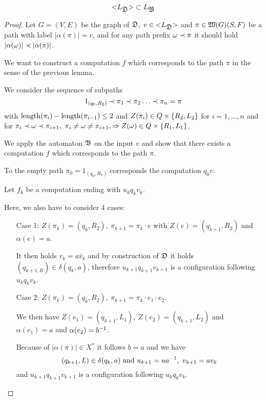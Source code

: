 \bigskip
\begin{lemma}
\[ \mbox{${<}{L_{\mbox{$\mathfrak{D}$}}}{>}$} \subset L_{\mbox{$\mathfrak{B}$}} \]
\end{lemma}

\begin{proof}
Let $G = (V, E)$ be the graph of $\mbox{$\mathfrak{D}$}$, $v \in \mbox{${<}{L_{\mbox{$\mathfrak{D}$}}}{>}$}$ and
$\pi \in \mbox{$\mathfrak{W}({G})$}(S, F)$ be a path with label $|\alpha(\pi)| = v$, and for
any path prefix $\omega \prec \pi$ it should hold $|\alpha(\omega)| \prec
|\alpha(\pi)|$.

We want to construct a computation $f$ which corresponds to the path $\pi$ in
the sense of the previous lemma.

We consider the sequence of subpaths
\[ 1_{(q_0, R_2)} \prec \pi_1 \prec \pi_2 \ldots \prec \pi_n = \pi \]
with $\mathrm{length}({\pi_i}) - \mathrm{length}({\pi_{i-1}}) \leq 2$ and $Z(\pi_i) \in Q \times
\mbox{$\{R_2, L_2\}$}$ for $i = 1, \ldots, n$ and for $\pi_i \prec \omega \prec
\pi_{i+1},\ \pi_i \neq \omega \neq \pi_{i+1}, \Rightarrow Z(\omega) \in Q \times
\mbox{$\{R_1, L_1\}$}$.

We apply the automaton $\mbox{$\mathfrak{B}$}$ on the input $v$ and show that there exists a
computation $f$ which corresponds to the path $\pi$.

\medskip
To the empty path $\pi_0 = 1_{(q_0, R_2)}$ corresponds the computation $q_0 v$.

Let $f_k$ be a computation ending with $u_k q_k v_k$.

Here, we also have to consider 4 cases:

\begin{itemize}
  \item[Case 1:] $Z(\pi_k) = (q_k, R_2),\ \pi_{k+1} = \pi_k \cdot e$ with $Z(e)
  = (q_{k+1}, R_2)$ and $\alpha(e) = a$.
  
  It then holds $v_k = a \bar{v}_k$ and by construction of $\mbox{$\mathfrak{D}$}$ it holds
  $(q_{k+1, R}) \in \delta(q_k, a)$, therefore $u_{k+1} q_{k+1} v_{k+1}$ is
  a configuration following $u_k q_k v_k$.
   
  \item[Case 2:] $Z(\pi_k) = (q_k, R_2),\ \pi_{k+1} = \pi_k \cdot e_1 \cdot
  e_2$.
  
  We then have $Z(e_1) = (q_{k+1}, L_1),\ Z(e_2) = (q_{k+1}, L_2)$ and
  $\alpha(e_1) = a$ and $\alpha(e_2) = {{b}^{-1}}$.
  
  Because of $|\alpha(\pi)| \in X^*$ it follows $b = a$ and we have
  \[ (q_{k+1}, L) \in \delta(q_k, a)\text{ and }u_{k+1} = u {{a}^{-1}},\
  v_{k+1} = a v_k \]
  and $u_{k+1} q_{k+1} v_{k+1}$ is a configuration following $u_k q_k v_k$.
  

\end{itemize}
\end{proof}
